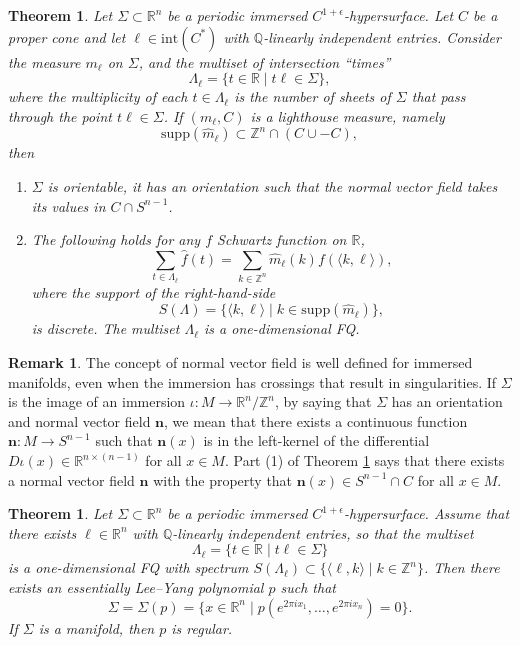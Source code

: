 \documentclass[11pt,letterpaper]{amsart}
\theoremstyle{definition}
\newtheorem{rem}[Def]{Remark}
\theoremstyle{plain}
\newtheorem{thm}[Def]{Theorem}
\newcommand{\nfield}{\mathbf n}
\newcommand{\R}{{\mathbb R}}
\newcommand{\Q}{{\mathbb Q}}
\newcommand{\Z}{{\mathbb Z}}
\begin{document}
\begin{thm}\label{thm: C to FQ}
    Let $\Sigma\subset\R^n$ be a periodic immersed $C^{1+\epsilon}$-hypersurface. Let $C$ be a proper cone and let $\ell\in \mathrm{int}(C^*)$ with $\Q$-linearly independent entries. Consider the measure $m_{\ell}$ on $\Sigma$, and the multiset of intersection ``times''
    \[\Lambda_{\ell}=\{t\in\R\mid t\ell\in\Sigma \},\]
    where the multiplicity of each $t\in \Lambda_\ell$ is the number of sheets of $\Sigma$ that pass through the point $t\ell\in\Sigma$.
    If $(m_{\ell},C)$ is a lighthouse measure, namely 
    \[\mathrm{supp}(\widehat{m}_{\ell})\subset \Z^n\cap\left(C\cup-C\right), \]
    then
    \begin{enumerate}
        \item $\Sigma$ is orientable, it has an orientation such that the normal vector field takes its values in $C\cap S^{n-1}$. 
        \item The following holds for any $f$ Schwartz function on $\R$,
       \begin{equation}\label{eq: summation formula}\sum_{t\in\Lambda_{\ell}}\hat{f}(t)=\sum_{k\in\Z^n}\widehat{m}_{\ell}(k){f}(\langle k,\ell\rangle),
       \end{equation} 
       where the support of the right-hand-side
       $$S(\Lambda)=\{\langle k,\ell \rangle\mid k\in\mathrm{supp}(\widehat{m}_{\ell})\},$$
       is discrete. The multiset $\Lambda_{\ell}$
is a one-dimensional FQ. 
    \end{enumerate}
\end{thm}
\begin{rem}
    The concept of normal vector field is well defined for immersed manifolds, even when the immersion has crossings that result in singularities. If $\Sigma$ is the image of an immersion $\iota\colon M\to\R^n/\Z^n$, by saying that $\Sigma$ has an orientation and normal vector field $\nfield$, we mean that there exists a continuous function $\nfield\colon M\to S^{n-1}$ such that $\nfield(x)$ is in the left-kernel of the differential $D\iota(x)\in\R^{n\times(n-1)}$ for all $x\in M$. Part (1) of Theorem \ref{thm: C to FQ} says that there exists a normal vector field $\nfield$ with the property that $\nfield(x)\in S^{n-1}\cap C$ for all $x\in M$.
\end{rem}
\begin{thm}\label{thm: FQ to p}
    Let $\Sigma\subset\R^n$ be a periodic immersed $C^{1+\epsilon}$-hypersurface. Assume that there exists $\ell\in\R^n$ with $\Q$-linearly independent entries, so that the multiset
\[\Lambda_{\ell}=\{t\in\R\mid t\ell\in\Sigma \}\]
is a one-dimensional FQ with spectrum $S(\Lambda_{\ell})\subset\{\langle\ell,k\rangle\mid k\in\Z^n\}$. Then there exists an essentially Lee--Yang polynomial $p$ such that 
\[\Sigma=\Sigma(p)=\{x\in\R^n\mid p(e^{2\pi i x_{1}},\ldots,e^{2\pi i x_{n}})=0 \}.\] 
If $\Sigma$ is a manifold, then $p$ is regular.
\end{thm}
\end{document}

